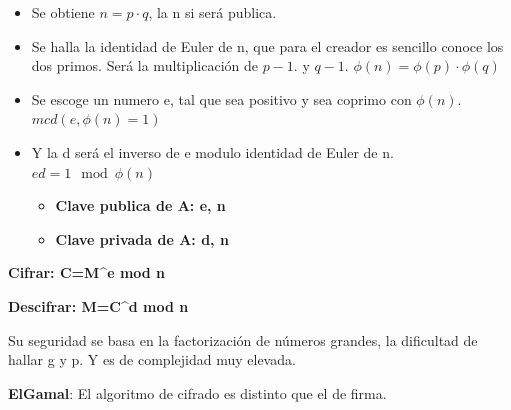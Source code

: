 \documentclass[12pt, twoside, openright]{report} %
\begin{document}
\begin{itemize}
\begin{itemize}
\begin{itemize}
      \item Se obtiene $n=p\cdot q$, la n si será publica.
        
      \item Se halla la identidad de Euler de n, que para el creador es
        sencillo conoce los dos primos. Será la multiplicación de $p-1$. y
        $q-1$. $\phi(n) = \phi(p)\cdot\phi(q)$
        
      \item Se escoge un numero e, tal que sea positivo y sea coprimo con
        $\phi (n)$. $mcd(e, \phi(n)=1)$
        
      \item Y la d será el inverso de e modulo identidad de Euler de n.
        $ed = 1 \mod \phi (n)$
        

        \begin{itemize}
        \item \textbf{Clave publica de A: e, n}
          
        \item \textbf{Clave privada de A: d, n}
          
        \end{itemize}
      \end{itemize}
    \end{itemize}
  \end{itemize}

  
\textbf{Cifrar: C=M\^{}e mod n}

\textbf{Descifrar: M=C\^{}d mod n}

  
  Su seguridad se basa en la factorización de números grandes, la
  dificultad de hallar g y p. Y es de complejidad muy elevada.
  

  
  \textbf{ElGamal}: El algoritmo de cifrado es distinto que el de firma.
  
\end{document}
